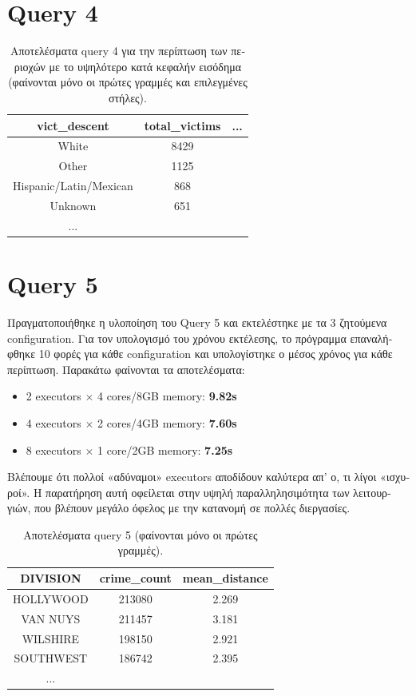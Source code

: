 \documentclass[a4paper,12pt]{article}
\begin{document}
\begin{otherlanguage}{greek}
\section*{Query 4}
	\FloatBarrier
	\lipsum[4] %
	\begin{table}[h]
		\centering
		\begin{tabular}{ccc}
			vict\_descent & total\_victims & ... \\
			\hline
			White & 8429 & \\
			Other & 1125 & \\
			Hispanic/Latin/Mexican & 868 & \\
			Unknown & 651 & \\
			...
		\end{tabular}
		\caption{Aποτελέσματα query 4 για την περίπτωση των
		περιοχών με το υψηλότερο κατά κεφαλήν εισόδημα 
		(φαίνονται μόνο οι 
		πρώτες γραμμές και επιλεγμένες στήλες).}
	\end{table}
	\FloatBarrier

\section*{Query 5}
	\FloatBarrier
	\par Πραγματοποιήθηκε η υλοποίηση του Query 5 και εκτελέστηκε με τα 3
	ζητούμενα configuration. Για τον υπολογισμό του χρόνου εκτέλεσης, το πρόγραμμα
	επαναλήφθηκε 10 φορές για κάθε configuration και υπολογίστηκε ο μέσος χρόνος για
	κάθε περίπτωση. Παρακάτω φαίνονται τα αποτελέσματα:
	\begin{itemize}
		\item 2 executors $\times$ 4 cores/8GB memory: \textbf{9.82s}
		\item 4 executors $\times$ 2 cores/4GB memory: \textbf{7.60s}
		\item 8 executors $\times$ 1 core/2GB memory: \textbf{7.25s}
	\end{itemize}
	\par Βλέπουμε ότι πολλοί «αδύναμοι» executors αποδίδουν καλύτερα απ' ο, τι λίγοι
	«ισχυροί». Η παρατήρηση αυτή οφείλεται στην υψηλή παραλληλησιμότητα των
	λειτουργιών, που βλέπουν μεγάλο όφελος με την κατανομή σε πολλές διεργασίες.
	\begin{table}[h]
		\centering
		\begin{tabular}{ccc}
			DIVISION & crime\_count & mean\_distance \\
			\hline
			HOLLYWOOD & 213080 & 2.269 \\
			VAN NUYS & 211457 & 3.181 \\
			WILSHIRE & 198150 & 2.921 \\
			SOUTHWEST & 186742 & 2.395 \\
			...
		\end{tabular}
		\caption{Aποτελέσματα query 5 (φαίνονται μόνο οι 
		πρώτες γραμμές).}
	\end{table}
	\FloatBarrier

\FloatBarrier
\printbibliography

\end{otherlanguage}
\end{document}
